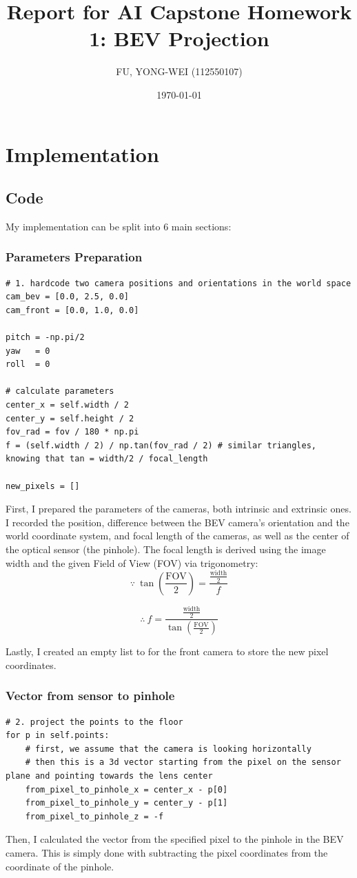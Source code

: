 \documentclass{article}
\title{Report for AI Capstone Homework 1: BEV Projection}
\author{FU, YONG-WEI (112550107) }
\date{\today}
\begin{document}
\maketitle

\section{Implementation}
\subsection{Code}
My implementation can be split into 6 main sections:

\subsubsection{Parameters Preparation}
\begin{verbatim}
# 1. hardcode two camera positions and orientations in the world space
cam_bev = [0.0, 2.5, 0.0]
cam_front = [0.0, 1.0, 0.0]

pitch = -np.pi/2
yaw   = 0  
roll  = 0

# calculate parameters
center_x = self.width / 2
center_y = self.height / 2
fov_rad = fov / 180 * np.pi
f = (self.width / 2) / np.tan(fov_rad / 2) # similar triangles, knowing that tan = width/2 / focal_length

new_pixels = []
\end{verbatim}

First, I prepared the parameters of the cameras, both intrinsic and extrinsic ones. 
I recorded the position, difference between the BEV camera's orientation and the world coordinate system, and focal length of the cameras, as well as the center of the 
optical sensor (the pinhole). The focal length is derived using the image width and the given Field 
of View (FOV) via trigonometry:
\[
    \because\ \tan(\frac{\text{FOV}}{2}) = \frac{\frac{\text{width}}{2}}{f}
\]

\[
    \therefore\ f = \frac{\frac{\text{width}}{2}}{\tan(\frac{\text{FOV}}{2})}
\]

Lastly, I created an empty list to for the front camera to store the new pixel coordinates.

\subsubsection{Vector from sensor to pinhole}
\begin{verbatim}
# 2. project the points to the floor 
for p in self.points:
    # first, we assume that the camera is looking horizontally
    # then this is a 3d vector starting from the pixel on the sensor plane and pointing towards the lens center
    from_pixel_to_pinhole_x = center_x - p[0]
    from_pixel_to_pinhole_y = center_y - p[1]
    from_pixel_to_pinhole_z = -f
\end{verbatim}
Then, I calculated the vector from the specified pixel to the pinhole in the BEV 
camera. This is simply done with subtracting the pixel coordinates from the coordinate of the pinhole.
\end{document}
